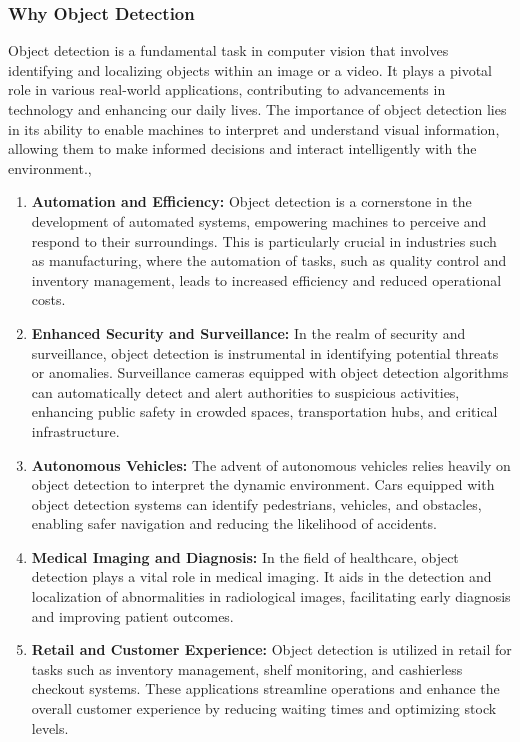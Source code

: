 \subsubsection{Why Object Detection}
Object detection is a fundamental task in computer vision that involves identifying and localizing objects within an image or a video. It plays a pivotal role in various real-world applications, contributing to advancements in technology and enhancing our daily lives. The importance of object detection lies in its ability to enable machines to interpret and understand visual information, allowing them to make informed decisions and interact intelligently with the environment.\cite{pathak2018application}, 
\begin{enumerate}
    \item \textbf{Automation and Efficiency:} Object detection is a cornerstone in the development of automated systems, empowering machines to perceive and respond to their surroundings. This is particularly crucial in industries such as manufacturing, where the automation of tasks, such as quality control and inventory management, leads to increased efficiency and reduced operational costs.
    \item \textbf{Enhanced Security and Surveillance:}  In the realm of security and surveillance, object detection is instrumental in identifying potential threats or anomalies. Surveillance cameras equipped with object detection algorithms can automatically detect and alert authorities to suspicious activities, enhancing public safety in crowded spaces, transportation hubs, and critical infrastructure.
    \item \textbf{Autonomous Vehicles:} The advent of autonomous vehicles relies heavily on object detection to interpret the dynamic environment. Cars equipped with object detection systems can identify pedestrians, vehicles, and obstacles, enabling safer navigation and reducing the likelihood of accidents.
    \item \textbf{Medical Imaging and Diagnosis:}  In the field of healthcare, object detection plays a vital role in medical imaging. It aids in the detection and localization of abnormalities in radiological images, facilitating early diagnosis and improving patient outcomes.
    \item \textbf{Retail and Customer Experience:} Object detection is utilized in retail for tasks such as inventory management, shelf monitoring, and cashierless checkout systems. These applications streamline operations and enhance the overall customer experience by reducing waiting times and optimizing stock levels.
\end{enumerate}

